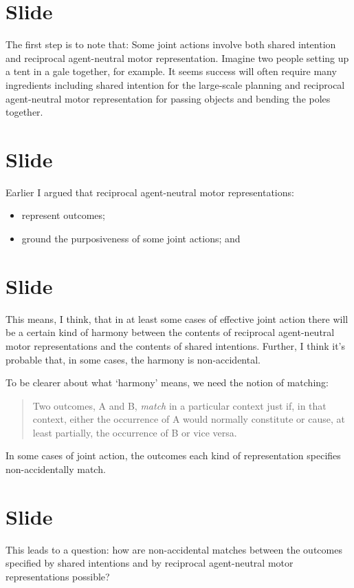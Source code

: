 \documentclass[12pt,\papersize]{extarticle}
\begin{document}
\section{Slide}
The first step is to note that:
Some joint actions involve both shared  intention and reciprocal agent-neutral motor representation.
Imagine two people setting up a tent in a gale together, for example.
It seems success will often require many ingredients including shared intention for the large-scale planning and reciprocal agent-neutral motor representation for passing objects and bending the poles together.



\section{Slide}
Earlier I argued that reciprocal agent-neutral motor representations:

\begin{itemize}
\item represent outcomes;

\item ground the purposiveness of some 
joint actions; and
\end{itemize}


\section{Slide}
This means, I think, that in at least some cases of effective joint action there will be a certain kind of harmony between the contents of 
 reciprocal agent-neutral motor representations
 and the contents of 
 shared intentions.
Further, I think it's probable that, in some cases, the harmony is non-accidental.
 
To be clearer about what `harmony' means, we need the notion of matching:
\begin{quote}
Two  outcomes, A and B, \emph{match} in a particular context just if, in that context, either the occurrence of A would normally constitute or cause, at least partially, the occurrence of B or vice versa. 
\end{quote}
In some cases of joint action, the outcomes each kind of representation specifies non-accidentally match.



\section{Slide}
This leads to a question: how are non-accidental matches between the outcomes specified by shared intentions and by reciprocal agent-neutral motor representations possible?
\end{document}
